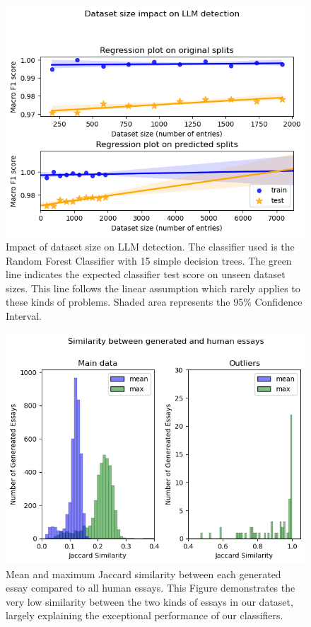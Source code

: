 \documentclass[11pt, a4paper]{article}
\begin{document}
	\begin{figure}
		\includegraphics[width=14cm]{dataset_size.png}
		\centering
		\caption{Impact of dataset size on LLM detection. The classifier used is the Random Forest Classifier with 15 simple decision trees. The green line indicates the expected classifier test score on unseen dataset sizes. This line follows the linear assumption which rarely applies to these kinds of problems. Shaded area represents the 95\% Confidence Interval.}
		\label{fig::dataset_size}
	\end{figure}
	
	\begin{figure}
		\includegraphics[width=14cm]{similarity.png}
		\centering
		\caption{Mean and maximum Jaccard similarity between each generated essay compared to all human essays. This Figure demonstrates the very low similarity between the two kinds of essays in our dataset, largely explaining the exceptional performance of our classifiers.}
		\label{fig::similarity}
	\end{figure}
	
\end{document}
